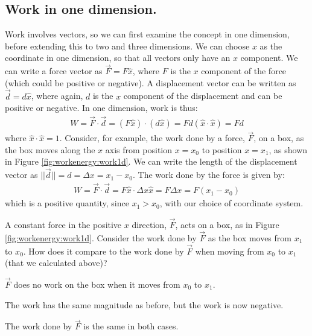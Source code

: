 \subsection{Work in one dimension.}
Work involves vectors, so we can first examine the concept in one dimension, before extending this to two and three dimensions. We can choose $x$ as the coordinate in one dimension, so that all vectors only have an $x$ component. We can write a force vector as $\vec F=F\hat x$, where $F$ is the $x$ component of the force (which could be positive or negative). A displacement vector can be written as $\vec d = d \hat x$, where again, $d$ is the $x$ component of the displacement and can be positive or negative. In one dimension, work is thus:
\begin{align*}
W = \vec F \cdot \vec d = (F\hat x) \cdot ( d\hat x ) = Fd (\hat x\cdot\hat x)=Fd
\end{align*}
where $\hat x \cdot \hat x = 1$. Consider, for example, the work done by a force, $\vec F$, on a box, as the box moves along the $x$ axis from position $x=x_0$ to position $x=x_1$, as shown in Figure \ref{fig:workenergy:work1d}.
We can write the length of the displacement vector as $||\vec d|| =d= \Delta x = x_1-x_0$. The work done by the force is given by:
\begin{align*}
W = \vec F \cdot \vec d = F\hat x\cdot \Delta x\hat x =F\Delta x =F(x_1-x_0) 
\end{align*}
which is a positive quantity, since $x_1 > x_0$, with our choice of coordinate system. 

\begin{checkpoint}
\begin{MCquestion}
{A constant force in the positive $x$ direction, $\vec F$, acts on a box, as in Figure \ref{fig:workenergy:work1d}. Consider the work done by $\vec F$ as the box moves from $x_1$ to $x_0$. How does it compare to the work done by $\vec F$ when moving from $x_0$ to $x_1$ (that we calculated above)?}
\item $\vec F$ does no work on the box when it moves from $x_0$ to $x_1$. 
\item The work has the same magnitude as before, but the work is now negative. \correct
\item The work done by $\vec F$ is the same in both cases.
\end{MCquestion}
\end{checkpoint}

